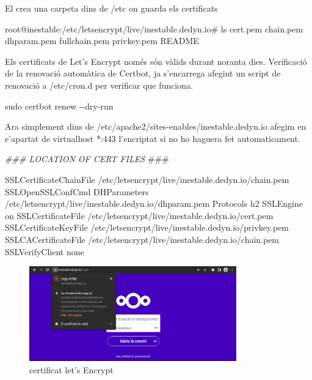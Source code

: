 \documentclass[
  10pt,
]{krantz}
\newenvironment{Shaded}{\begin{snugshade}}{\end{snugshade}}
\newcommand{\AlertTok}[1]{\textcolor[rgb]{0.94,0.16,0.16}{#1}}
\newcommand{\AttributeTok}[1]{\textcolor[rgb]{0.77,0.63,0.00}{#1}}
\newcommand{\CommentTok}[1]{\textcolor[rgb]{0.56,0.35,0.01}{\textit{#1}}}
\newcommand{\ExtensionTok}[1]{#1}
\newcommand{\FunctionTok}[1]{\textcolor[rgb]{0.00,0.00,0.00}{#1}}
\newcommand{\NormalTok}[1]{#1}
\begin{document}
El crea una carpeta dins de /etc on guarda els certificats

\begin{Shaded}
\begin{Highlighting}[]
\ExtensionTok{root@inestable:/etc/letsencrypt/live/inestable.dedyn.io\#}\NormalTok{ ls}
\ExtensionTok{cert.pem}\NormalTok{  chain.pem  dhparam.pem  fullchain.pem  privkey.pem  README}
\end{Highlighting}
\end{Shaded}

Els certificats de Let's Encrypt només són vàlids durant noranta dies. Verificació de la renovació automàtica de Certbot, ja s'encarrega afegint un script de renovació a /etc/cron.d per verificar que funciona.

\begin{Shaded}
\begin{Highlighting}[]
\FunctionTok{sudo}\NormalTok{ certbot renew }\AttributeTok{{-}{-}dry{-}run}
\end{Highlighting}
\end{Shaded}

Ara simplement dins de /etc/apache2/sites-enables/inestable.dedyn.io afegim en e'apartat de virtualhost *:443 l'encriptat si no ho haguera fet automaticament.

\begin{Shaded}
\begin{Highlighting}[]
 \CommentTok{\#\#\# LOCATION OF CERT FILES }\AlertTok{\#\#\#}

    \ExtensionTok{SSLCertificateChainFile}\NormalTok{ /etc/letsencrypt/live/inestable.dedyn.io/chain.pem}
    \ExtensionTok{SSLOpenSSLConfCmd}\NormalTok{ DHParameters /etc/letsencrypt/live/inestable.dedyn.io/dhparam.pem}
    \ExtensionTok{Protocols}\NormalTok{ h2}
    \ExtensionTok{SSLEngine}\NormalTok{ on}
    \ExtensionTok{SSLCertificateFile}\NormalTok{ /etc/letsencrypt/live/inestable.dedyn.io/cert.pem}
    \ExtensionTok{SSLCertificateKeyFile}\NormalTok{ /etc/letsencrypt/live/inestable.dedyn.io/privkey.pem}
    \ExtensionTok{SSLCACertificateFile}\NormalTok{ /etc/letsencrypt/live/inestable.dedyn.io/chain.pem}
    \ExtensionTok{SSLVerifyClient}\NormalTok{ none}
\end{Highlighting}
\end{Shaded}

\begin{figure}
\centering
\includegraphics[width=0.8\textwidth,height=\textheight]{imatges/proxmox/cert_nextcloud.png}
\caption{certificat let's Encrypt}
\end{figure}
\end{document}
